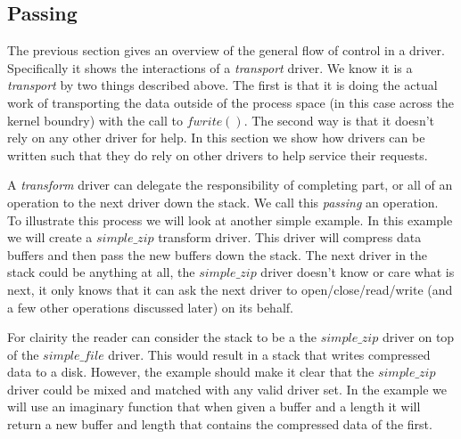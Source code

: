 \documentclass[11pt]{article}
\begin{document}
\subsection{Passing}
The previous section gives an overview of the general flow of control
in a driver.  Specifically it shows the interactions of a \emph{transport}
driver.  We know it is a \emph{transport} by two things described above.
The first is that it is doing the actual work of transporting the data
outside of the process space (in this case across the kernel boundry) 
with the call to $fwrite()$.  The second way is that it doesn't rely
on any other driver for help.  In this section we show how drivers 
can be written such that they do rely on other drivers to help service
their requests.

A \emph{transform} driver can delegate the responsibility of completing
part, or all of an operation to the next driver down the stack.  We call
this \emph{passing} an operation.  To illustrate this process we will
look at another simple example.  
In this example we will create a $simple\_zip$ transform driver.  This
driver will compress data buffers and then pass the new buffers down the 
stack.  The next driver in the stack could be anything at all, the 
$simple\_zip$ driver doesn't know or care what is next, it only knows
that it can ask the next driver to open/close/read/write (and a few other 
operations discussed later) on its behalf.

For clairity the reader can consider the stack to be a the $simple\_zip$
driver on top of the $simple\_file$ driver.  This would result in a stack
that writes compressed data to a disk.  However, the example should make it
clear that the $simple\_zip$ driver could be mixed and matched with any 
valid driver set.  In the example we will use an imaginary function that 
when given a buffer and a length it will return a new buffer and length
that contains the compressed data of the first.
\end{document}
